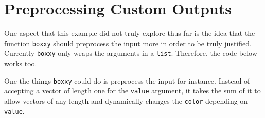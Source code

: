 \documentclass[10pt,]{krantz}
\makeatletter
\newenvironment{Shaded}{\begin{snugshade}}{\end{snugshade}}
\newcommand{\CommentTok}[1]{\textcolor[rgb]{0.37,0.37,0.37}{\textit{#1}}}
\newcommand{\ControlFlowTok}[1]{\textcolor[rgb]{0.27,0.27,0.27}{\textbf{#1}}}
\newcommand{\DataTypeTok}[1]{\textcolor[rgb]{0.27,0.27,0.27}{#1}}
\newcommand{\DecValTok}[1]{\textcolor[rgb]{0.06,0.06,0.06}{#1}}
\newcommand{\KeywordTok}[1]{\textcolor[rgb]{0.27,0.27,0.27}{\textbf{#1}}}
\newcommand{\NormalTok}[1]{#1}
\newcommand{\OperatorTok}[1]{\textcolor[rgb]{0.43,0.43,0.43}{\textbf{#1}}}
\newcommand{\OtherTok}[1]{\textcolor[rgb]{0.37,0.37,0.37}{#1}}
\newcommand{\StringTok}[1]{\textcolor[rgb]{0.5,0.5,0.5}{#1}}
\newenvironment{kframe}{%
\medskip{}
\setlength{\fboxsep}{.8em}
 \def\at@end@of@kframe{}%
 \ifinner\ifhmode%
  \def\at@end@of@kframe{\end{minipage}}%
  \begin{minipage}{\columnwidth}%
 \fi\fi%
 \def\FrameCommand##1{\hskip\@totalleftmargin \hskip-\fboxsep
 \colorbox{shadecolor}{##1}\hskip-\fboxsep
     \hskip-\linewidth \hskip-\@totalleftmargin \hskip\columnwidth}%
 \MakeFramed {\advance\hsize-\width
   \@totalleftmargin\z@ \linewidth\hsize
   \@setminipage}}%
 {\par\unskip\endMakeFramed%
 \at@end@of@kframe}
\renewenvironment{Shaded}{\begin{kframe}}{\end{kframe}}
\makeatother
\begin{document}
\hypertarget{shiny-output-preprocess}{%
\section{Preprocessing Custom Outputs}\label{shiny-output-preprocess}}

One aspect that this example did not truly explore thus far is the idea that the function \texttt{boxxy} should preprocess the input more in order to be truly justified. Currently \texttt{boxxy} only wraps the arguments in a \texttt{list}. Therefore, the code below works too.

\begin{Shaded}
\end{Shaded}

One the things \texttt{boxxy} could do is preprocess the input for instance. Instead of accepting a vector of length one for the \texttt{value} argument, it takes the sum of it to allow vectors of any length and dynamically changes the \texttt{color} depending on \texttt{value}.

\begin{Shaded}
\end{Shaded}
\end{document}
